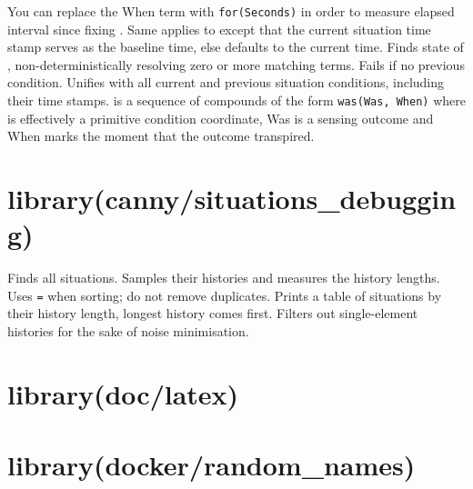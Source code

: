 \begin{description}
\begin{description}
You can replace the When term with \verb$for(Seconds)$ in order to
measure elapsed interval since fixing . Same applies to
 except that the current situation time stamp serves
as the baseline time, else defaults to the current time.
Finds  state of , non-deterministically
resolving zero or more matching  terms. Fails if no
previous  condition.
Unifies  with all current and previous situation
conditions, including their time stamps.  is a sequence
of compounds of the form \verb$was(Was, When)$ where  is
effectively a primitive condition coordinate, Was is a sensing
outcome and When marks the moment that the outcome transpired.
\end{description}
\end{description}

\chapter{library(canny/situations_debugging)}\label{sec:situationsdebugging}

\begin{description}
Finds all situations. Samples their histories and measures the
history lengths. Uses \verb$=$ when sorting; do not remove duplicates.
Prints a table of situations by their history length, longest
history comes first. Filters out single-element histories for the
sake of noise minimisation.
\end{description}

\chapter{library(doc/latex)}\label{sec:latex}

\begin{description}
\end{description}

\chapter{library(docker/random_names)}\label{sec:randomnames}


